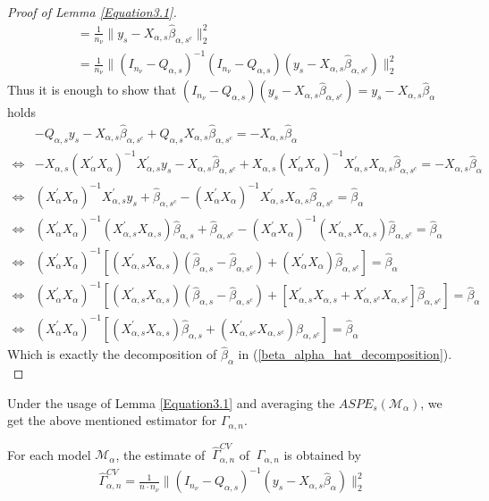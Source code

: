 \documentclass[Research_Module_ES.tex]{subfiles}
\begin{document}
\begin{proof}[Proof of Lemma \ref{Equation3.1}]
\begin{align*}
	&=\frac{1}{n_\nu}\parallel y_s-X_{\alpha,s}\hat{\beta}_{\alpha,s^c}\parallel_2^2\\
	&=\frac{1}{n_\nu}\parallel (I_{n_\nu}-Q_{\alpha,s})^{-1}(I_{n_\nu}-Q_{\alpha,s})(y_s-X_{\alpha,s}\hat{\beta}_{\alpha,s^c})\parallel_2^2
	\end{align*}
	Thus it is enough to show that $(I_{n_\nu}-Q_{\alpha,s})(y_s-X_{\alpha,s}\hat{\beta}_{\alpha,s^c})=y_s-X_{\alpha,s}\hat{\beta}_\alpha$ holds 
	\begin{align*}
		&-Q_{\alpha,s}y_s-X_{\alpha,s}\hat{\beta}_{\alpha,s^c}+Q_{\alpha,s}X_{\alpha,s}\hat{\beta}_{\alpha,s^c}=-X_{\alpha,s}\hat{\beta}_\alpha\\
		\Leftrightarrow&-X_{\alpha,s}(X_{\alpha}^\prime X_{\alpha})^{-1}X_{\alpha,s}^\prime y_s- X_{\alpha,s}\hat{\beta}_{\alpha,s^c}+X_{\alpha,s}(X_{\alpha}^\prime X_{\alpha})^{-1}X_{\alpha,s}^\prime X_{\alpha,s}\hat{\beta}_{\alpha,s^c}=-X_{\alpha,s}\hat{\beta}_{\alpha}\\
		\Leftrightarrow&(X_{\alpha}^\prime X_{\alpha})^{-1}X_{\alpha,s}^\prime y_s+ \hat{\beta}_{\alpha,s^c}-(X_{\alpha}^\prime X_{\alpha})^{-1}X_{\alpha,s}^\prime X_{\alpha,s}\hat{\beta}_{\alpha,s^c}=\hat{\beta}_{\alpha}\\
		\Leftrightarrow&(X_{\alpha}^\prime X_{\alpha})^{-1}(X_{\alpha,s}^\prime X_{\alpha,s})\hat{\beta}_{\alpha,s}+ \hat{\beta}_{\alpha,s^c}-(X_{\alpha}^\prime X_{\alpha})^{-1}(X_{\alpha,s}^\prime X_{\alpha,s})\hat{\beta}_{\alpha,s^c}=\hat{\beta}_{\alpha}\\
		\Leftrightarrow&(X_{\alpha}^\prime X_{\alpha})^{-1}[(X_{\alpha,s}^\prime X_{\alpha,s})(\hat{\beta}_{\alpha,s}-\hat{\beta}_{\alpha,s^c})+(X_{\alpha}^\prime X_{\alpha})\hat{\beta}_{\alpha,s^c}]=\hat{\beta}_{\alpha}\\
		\Leftrightarrow&(X_{\alpha}^\prime X_{\alpha})^{-1}[(X_{\alpha,s}^\prime X_{\alpha,s})(\hat{\beta}_{\alpha,s}-\hat{\beta}_{\alpha,s^c})+[X_{\alpha,s}^\prime X_{\alpha,s}+X_{\alpha,s^c}^\prime X_{\alpha,s^c}]\hat{\beta}_{\alpha,s^c}]=\hat{\beta}_{\alpha}\\
		\Leftrightarrow&(X_\alpha^\prime X_\alpha)^{-1}[(X_{\alpha,s}^\prime X_{\alpha,s}) \hat{\beta}_{\alpha,s}+(X_{\alpha,s^c}^\prime X_{\alpha,s^c})\hat{\beta}_{\alpha,s^c}]=\hat{\beta}_{\alpha}
	\end{align*}
Which is exactly the decomposition of $\hat{\beta}_{\alpha}$ in   (\ref{beta_alpha_hat_decomposition}).\\
\end{proof}

Under the usage of Lemma \ref{Equation3.1} and averaging the $ASPE_{s}(\mathcal{M}_\alpha)$, we get the above mentioned estimator for $\Gamma_{\alpha,n}$.
\begin{lemma}
	For each model $\mathcal{M}_\alpha$, the estimate of $~\hat{\Gamma}_{\alpha,n}^{CV}$ of $~\Gamma_{\alpha,n}$ is obtained by
	\begin{align*}
		\hat{\Gamma}_{\alpha,n}^{CV}=\frac{1}{n \cdot n_\nu}\parallel (I_{n_\nu}-Q_{\alpha,s})^{-1}(y_s-X_{\alpha,s}\hat{\beta}_\alpha)\parallel_2^2
	\end{align*}
	
\end{lemma}
\end{document}
